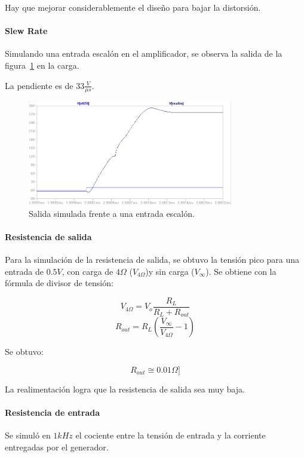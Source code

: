 \documentclass[a4paper,12pt,twoside]{article}
\begin{document}
Hay que mejorar considerablemente el diseño para bajar la distorsión.

\paragraph{Slew Rate} Simulando una entrada escalón en el amplificador, se observa la salida de la figura~\ref{fig:slew} en la carga.

La pendiente es de $33 \frac{V}{\mu s}$.


\begin{figure}[H]
	\centering
	\includegraphics[width=0.8\textwidth]{img/sim/slew}
	\caption{Salida simulada frente a una entrada escalón.}
	\label{fig:slew}
\end{figure}


\paragraph{Resistencia de salida}  

Para la simulación de la resistencia de salida, se obtuvo la tensión pico para una entrada de $0.5V$, con carga de $4\Omega$ ($V_{4\Omega}$)y sin carga ($V_{\infty}$). Se obtiene con la fórmula de divisor de tensión:

\[V_{4\Omega}=V_o \frac{R_L}{R_L+R_{out}}\]
\[R_{out}=R_L \left(\frac{V_{\infty}}{V_{4\Omega}}-1 \right)\]

Se obtuvo:

\[R_{out}\cong 0.01\Omega]\]

La realimentación logra que la resistencia de salida sea muy baja.

\paragraph{Resistencia de entrada}

Se simuló en $1kHz$ el cociente entre la tensión de entrada y la corriente entregadas por el generador.
\end{document}
